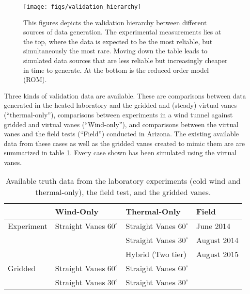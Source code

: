 %
%
 \begin{figure}[!htb]
   \begin{center}
    \texttt{[image: figs/validation\_hierarchy]}
    \caption{This figures depicts the validation hierarchy between
    different sources of data generation. The experimental measurements
    lies at the top, where the data is expected to be the most reliable,
    but simultaneously the most rare. Moving down the table leads to
    simulated data sources that are less reliable but increasingly
    cheaper in time to generate. At the bottom is the reduced order
    model (ROM).} 
    \label{fig:val_hier}
   \end{center}
 \end{figure}

Three kinds of validation data are available. These are comparisons
between data generated in the heated laboratory and the gridded and
(steady) virtual vanes (``thermal-only''), comparisons between
experiments in a wind tunnel against gridded and virtual vanes
(``Wind-only''), and comparisons between the virtual vanes and the field
tests (``Field'') conducted in Arizona. The existing available data from
these cases as well as the gridded vanes created to mimic them are are
summarized in table \ref{tab:val_data}. Every case shown has been
simulated using the virtual vanes.   

\large
\begin{table}[h]
\centering
\label{my-label}
\begin{tabular}{l|l|l|l|}
           & Wind-Only                   & Thermal-Only                & Field  \\
  \hline 
Experiment & Straight Vanes $60^{\circ}$ & Straight Vanes $60^{\circ}$ & June 2014   \\
           &                           & Straight Vanes $30^{\circ}$   & August 2014 \\
           &                           & Hybrid (Two tier)             & August 2015 \\
  \hline 
Gridded    & Straight Vanes $60^{\circ}$ & Straight Vanes $60^{\circ}$ & \\
           & Straight Vanes $30^{\circ}$ & Straight Vanes $30^{\circ}$ & \\
  \hline 
\end{tabular}
  \caption{Available truth data from the laboratory experiments 
    (cold wind and thermal-only), the field test, and the gridded vanes.} 
  \label{tab:val_data}
\end{table}
%
%
%
%
%

